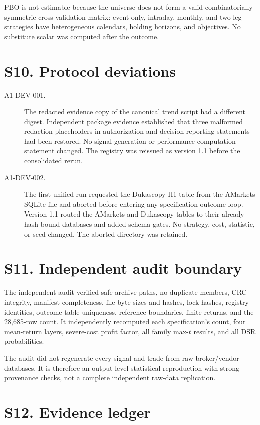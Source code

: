 \documentclass[a4paper,fleqn]{cas-sc}
\begin{document}


PBO is not estimable because the universe does not form a valid combinatorially symmetric cross-validation matrix: event-only, intraday, monthly, and two-leg strategies have heterogeneous calendars, holding horizons, and objectives. No substitute scalar was computed after the outcome.

\section*{S10. Protocol deviations}

\begin{description}
\item[A1-DEV-001.] The redacted evidence copy of the canonical trend script had a different digest. Independent package evidence established that three malformed redaction placeholders in authorization and decision-reporting statements had been restored. No signal-generation or performance-computation statement changed. The registry was reissued as version 1.1 before the consolidated rerun.
\item[A1-DEV-002.] The first unified run requested the Dukascopy H1 table from the AMarkets SQLite file and aborted before entering any specification-outcome loop. Version 1.1 routed the AMarkets and Dukascopy tables to their already hash-bound databases and added schema gates. No strategy, cost, statistic, or seed changed. The aborted directory was retained.
\end{description}

\section*{S11. Independent audit boundary}

The independent audit verified safe archive paths, no duplicate members, CRC integrity, manifest completeness, file byte sizes and hashes, lock hashes, registry identities, outcome-table uniqueness, reference boundaries, finite returns, and the 28,685-row count. It independently recomputed each specification's count, four mean-return layers, severe-cost profit factor, all family max-$t$ results, and all DSR probabilities.

The audit did not regenerate every signal and trade from raw broker/vendor databases. It is therefore an output-level statistical reproduction with strong provenance checks, not a complete independent raw-data replication.

\section*{S12. Evidence ledger}
\end{document}
